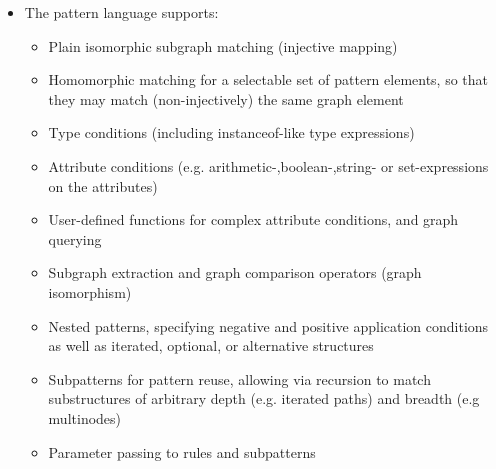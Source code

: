 \begin{itemize}
  \item The pattern language supports:
  \begin{itemize}
    \item Plain isomorphic subgraph matching (injective mapping)
    \item Homomorphic matching for a selectable set of pattern elements, so that they may match (non-injectively) the same graph element
    \item Type conditions (including instanceof-like type expressions)
    \item Attribute conditions (e.g. arithmetic-,boolean-,string- or set-expressions on the attributes)
    \item User-defined functions for complex attribute conditions, and graph querying
    \item Subgraph extraction and graph comparison operators (graph isomorphism)
    \item Nested patterns, specifying negative and positive application conditions as well as iterated, optional, or alternative structures
    \item Subpatterns for pattern reuse, allowing via recursion to match substructures of arbitrary depth (e.g. iterated paths) and breadth (e.g multinodes)
    \item Parameter passing to rules and subpatterns
  \end{itemize}


\end{itemize}

